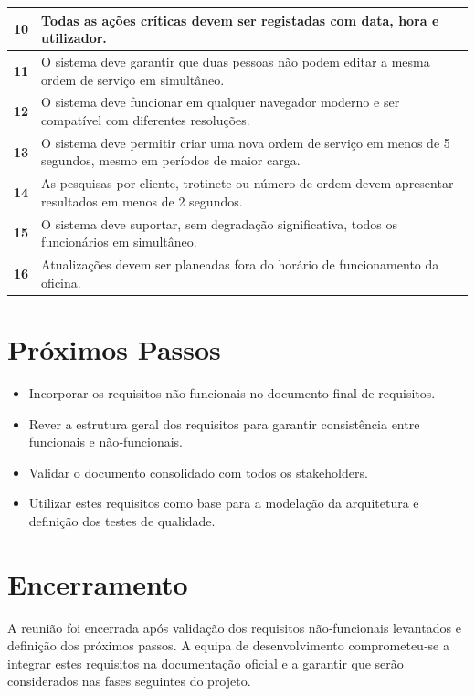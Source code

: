 \documentclass[12pt]{article}
\begin{document}
\begin{tabularx}{\textwidth}{@{}|l|X|@{}}
\textbf{10} & Todas as ações críticas devem ser registadas com data, hora e utilizador. \\ \hline

\textbf{11} & O sistema deve garantir que duas pessoas não podem editar a mesma ordem de serviço em simultâneo. \\ \hline

\textbf{12} & O sistema deve funcionar em qualquer navegador moderno e ser compatível com diferentes resoluções. \\ \hline

\textbf{13} & O sistema deve permitir criar uma nova ordem de serviço em menos de 5 segundos, mesmo em períodos de maior carga. \\ \hline

\textbf{14} & As pesquisas por cliente, trotinete ou número de ordem devem apresentar resultados em menos de 2 segundos. \\ \hline

\textbf{15} & O sistema deve suportar, sem degradação significativa, todos os funcionários em simultâneo. \\ \hline

\textbf{16} & Atualizações devem ser planeadas fora do horário de funcionamento da oficina. \\ \hline

\end{tabularx}

\vspace{0.5cm}

\section*{Próximos Passos}

\begin{itemize}
\item Incorporar os requisitos não‑funcionais no documento final de requisitos.
\item Rever a estrutura geral dos requisitos para garantir consistência entre funcionais e não‑funcionais.
\item Validar o documento consolidado com todos os stakeholders.
\item Utilizar estes requisitos como base para a modelação da arquitetura e definição dos testes de qualidade.
\end{itemize}

\vspace{0.5cm}

\section*{Encerramento}

A reunião foi encerrada após validação dos requisitos não‑funcionais levantados e definição dos próximos passos. A equipa de desenvolvimento comprometeu‑se a integrar estes requisitos na documentação oficial e a garantir que serão considerados nas fases seguintes do projeto.
\end{document}
